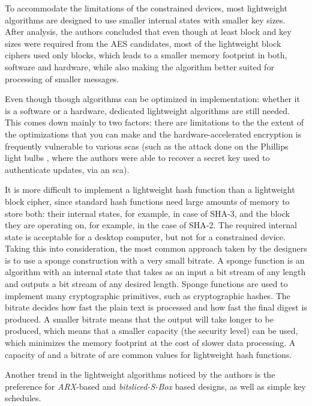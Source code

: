 \documentclass{llncs}
\begin{document}
{To accommodate the limitations of the constrained devices, most lightweight algorithms
are designed to use smaller internal states with smaller key sizes. After analysis,
the authors concluded that even though at least  block and
key sizes were required from the AES candidates, most of the lightweight
block ciphers used only  blocks, which leads to a smaller memory
footprint in both, software and hardware, while also making the algorithm better suited
for processing of smaller messages.

Even though though algorithms can be optimized in implementation: whether it is
a software or a hardware, dedicated lightweight algorithms are still needed.
This comes down mainly to two factors: there are limitations to the the extent of
the optimizations that you can make and the hardware-accelerated encryption is
frequently vulnerable to various \gls{sca}s (such as the attack done on the
Phillips light bulbs \cite{cryptoeprint:2016:1047}, where the authors were able to
recover a secret key used to authenticate updates, via an \gls{sca}).

It is more difficult to implement a lightweight hash function than a lightweight
block cipher, since standard hash functions need large amounts
of memory to store both: their internal states, for example,  in case of SHA-3,
and the block they are operating on, for example,  in the case of SHA-2.
The required internal state is acceptable for a desktop computer, but not for a
constrained device. Taking this into consideration, the most common approach
taken by the designers is to use a sponge construction with a very small bitrate.
A sponge function is an algorithm with an internal state that takes as an input
a bit stream of any length and outputs a bit stream of any desired length. Sponge
functions are used to implement many cryptographic primitives, such as cryptographic
hashes. The bitrate decides how fast the plain text is processed and how fast the
final digest is produced. A smaller bitrate means that the output will take longer
to be produced, which means that a smaller capacity (the security level)
can be used, which minimizes the memory footprint at the cost of slower data
processing. A capacity of  and a bitrate of 
are common values for lightweight hash functions.

Another trend in the lightweight algorithms noticed by the authors is the
preference for \textit{ARX}-based and \textit{bitsliced-S-Box} based designs, as well as simple key schedules.

}
\end{document}
